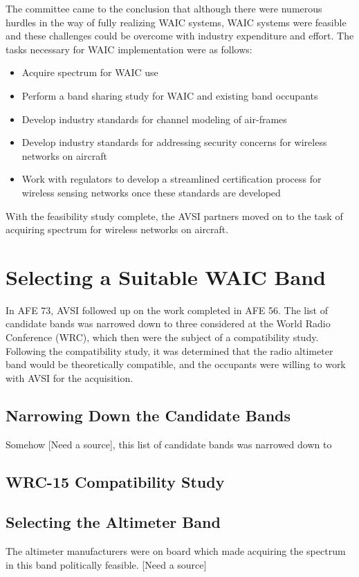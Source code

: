 The committee came to the conclusion that although there were numerous hurdles in the way of fully realizing WAIC systems, WAIC systems were feasible and these challenges could be overcome with industry expenditure and effort. The tasks necessary for WAIC implementation were as follows: 
\begin{itemize}
\item Acquire spectrum for WAIC use
\item Perform a band sharing study for WAIC and existing band occupants
\item Develop industry standards for channel modeling of air-frames
\item Develop industry standards for addressing security concerns for wireless networks on aircraft
\item Work with regulators to develop a streamlined certification process for wireless sensing networks once these standards are developed
\end{itemize}
 
 With the feasibility study complete, the AVSI partners moved on to the task of acquiring spectrum for wireless networks on aircraft. 
 
\section{Selecting a Suitable WAIC Band}
In AFE 73, AVSI followed up on the work completed in AFE 56. The list of candidate bands was narrowed down to three considered at the World Radio Conference (WRC), which then were the subject of a compatibility study. Following the compatibility study, it was determined that the radio altimeter band would be theoretically compatible, and the occupants were willing to work with AVSI for the acquisition. 
\subsection{Narrowing Down the Candidate Bands}
Somehow [Need a source], this list of candidate bands was narrowed down to  
\subsection{WRC-15 Compatibility Study}

\subsection{Selecting the Altimeter Band}
The altimeter manufacturers were on board which made acquiring the spectrum in this band politically feasible. [Need a source]

